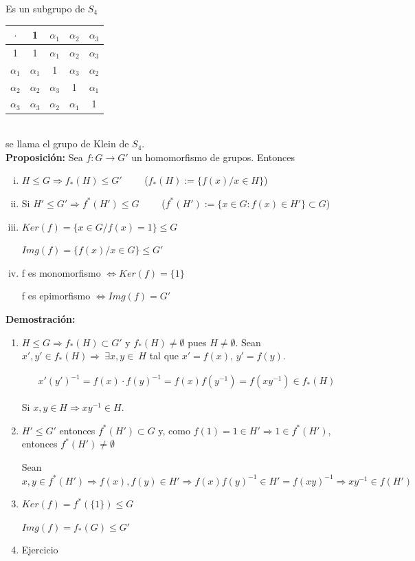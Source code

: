 \documentclass{article}
\begin{document}
Es un subgrupo de $S_4$ \\

\begin{tabular}{c | c c c c}
$\cdot$ & 1 & $\alpha_1$ & $\alpha_2$ & $\alpha_3$ \\
\hline
1 & 1 & $\alpha_1$ & $\alpha_2$ & $\alpha_3$ \\ 
$\alpha_1$ & $\alpha_1$ & 1 & $\alpha_3$ & $\alpha_2$ \\
$\alpha_2$ & $\alpha_2$ & $\alpha_3$ & 1 & $\alpha_1$ \\
$\alpha_3$ & $\alpha_3$ & $\alpha_2$ & $\alpha_1$ & 1
\end{tabular} \\ 

se llama el grupo de Klein de $S_4$. \\

\textbf{Proposición:} Sea $f: G \rightarrow G'$ un homomorfismo de grupos. Entonces

\begin{enumerate}[(i)]
\item $H \leq G \Rightarrow f_*(H)\leq G' \qquad$ ($f_*(H):=\{f(x)/x\in H\}$)

\item Si $H'\leq G' \Rightarrow f^*(H')\leq G \qquad$ ($f^*(H'):=\{x\in G:f(x)\in H'\}\subset G$)

\item $Ker(f)=\{x \in G/f(x)=1\} \leq G$ 

$Img(f)=\{f(x)/x\in G\}\leq G'$

\item f es monomorfismo $\Leftrightarrow Ker(f)=\{1\}$ 

f es epimorfismo $\Leftrightarrow Img(f)=G'$
\end{enumerate}

\textbf{Demostración:}
\begin{enumerate}[\bfseries (i)]
\item $H \leq G \Rightarrow f_*(H)\subset G'$ y $f_*(H)\neq \emptyset$ pues $H\neq \emptyset$. Sean $x',y'\in f_*(H) \Rightarrow~\exists x,y\in~H$ tal que $x'=f(x)$, $y'=f(y)$.

\begin{gather*}
x'(y')^{-1}=f(x)\cdot f(y)^{-1}=f(x)f(y^{-1})=f(xy^{-1})\in f_*(H)
\end{gather*}

Si $x,y\in H \Rightarrow xy^{-1} \in H$.

\item $H'\leq G'$ entonces $f^*(H')\subset G$ y, como $f(1)=1\in H' \Rightarrow 1\in f^*(H')$, entonces $f^*(H')\neq \emptyset$

Sean $x,y\in f^*(H')\Rightarrow f(x),f(y)\in H' \Rightarrow f(x)f(y)^{-1}\in H'=f(xy)^{-1} \Rightarrow xy^{-1}\in f(H')$ 

\item $Ker(f)=f^*(\{1\})\leq G$

$Img(f)=f_*(G)\leq G'$

\item Ejercicio
\end{enumerate}
\end{document}
